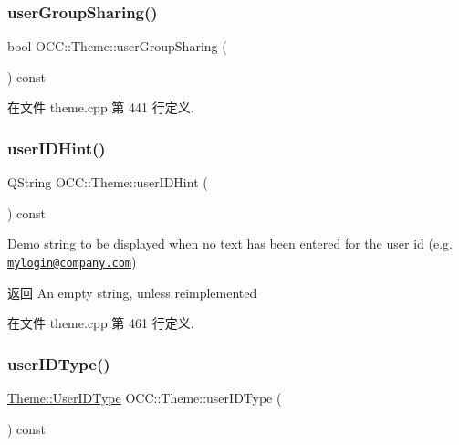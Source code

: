 \subsubsection{\texorpdfstring{user\+Group\+Sharing()}{userGroupSharing()}}
{\footnotesize\ttfamily bool O\+C\+C\+::\+Theme\+::user\+Group\+Sharing (\begin{DoxyParamCaption}{ }\end{DoxyParamCaption}) const\hspace{0.3cm}{\ttfamily [virtual]}}



在文件 theme.\+cpp 第 441 行定义.

\mbox{\label{class_o_c_c_1_1_theme_a1a26fc6ab12fce4b1203c9a0fa15c988}} 
\subsubsection{\texorpdfstring{user\+I\+D\+Hint()}{userIDHint()}}
{\footnotesize\ttfamily Q\+String O\+C\+C\+::\+Theme\+::user\+I\+D\+Hint (\begin{DoxyParamCaption}{ }\end{DoxyParamCaption}) const\hspace{0.3cm}{\ttfamily [virtual]}}



Demo string to be displayed when no text has been entered for the user id (e.\+g. \href{mailto:mylogin@company.com}{\tt mylogin@company.\+com}) 

\begin{DoxyReturn}{返回}
An empty string, unless reimplemented 
\end{DoxyReturn}


在文件 theme.\+cpp 第 461 行定义.

\mbox{\label{class_o_c_c_1_1_theme_ad707332beddeb62a8b1bf248df4e27c4}} 
\subsubsection{\texorpdfstring{user\+I\+D\+Type()}{userIDType()}}
{\footnotesize\ttfamily \hyperlink{class_o_c_c_1_1_theme_a134c3c8a839c3cb454b73e8c28f2e6ce}{Theme\+::\+User\+I\+D\+Type} O\+C\+C\+::\+Theme\+::user\+I\+D\+Type (\begin{DoxyParamCaption}{ }\end{DoxyParamCaption}) const\hspace{0.3cm}{\ttfamily [virtual]}}




